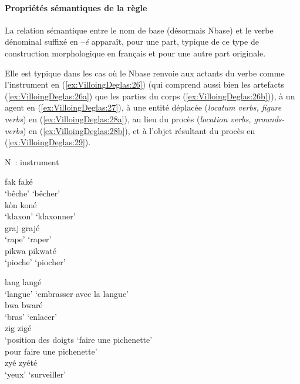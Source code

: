 \documentclass[output=paper]{langsci/langscibook}
\begin{document}
\paragraph{Propriétés sémantiques de la
règle}\label{propriétés-sémantiques-de-la-ruxe8gle}

La relation sémantique entre le nom de base (désormais Nbase) et le
verbe dénominal suffixé en --\emph{é} apparaît, pour une part, typique
de ce type de construction morphologique en français et pour une autre
part originale.

Elle est typique dans les cas où le Nbase renvoie aux actants du verbe
comme l'instrument en (\ref{ex:VilloingDeglas:26}) (qui comprend aussi bien les artefacts (\ref{ex:VilloingDeglas:26a})
que les parties du corps (\ref{ex:VilloingDeglas:26b})), à un agent en (\ref{ex:VilloingDeglas:27}), à une entité
déplacée (\emph{locatum verbs, figure verbs}) en (\ref{ex:VilloingDeglas:28a}), au lieu du
procès (\emph{location verbs, grounds-verbs}) en (\ref{ex:VilloingDeglas:28b}), et à l'objet
résultant du procès en (\ref{ex:VilloingDeglas:29}).

\ea \label{ex:VilloingDeglas:26} N~: instrument

  \ea\label{ex:VilloingDeglas:26a}
  \ea \gll fak \textrightarrow{} faké\\
  {`bêche'} {} {`bêcher'}\\
  \ex \gll kòn \textrightarrow{} koné\\
  {`klaxon'} {} {`klaxonner'}\\
  \ex \gll graj \textrightarrow{} grajé\\
  {`rape'} {} {`raper'}\\
  \ex \gll pikwa \textrightarrow{} pikwaté\\
  {`pioche'} {} {`piocher'}\\
  \z

  \ex\label{ex:VilloingDeglas:26b}
  \ea \gll lang \textrightarrow{} langé\\
  {`langue'} {} {`embrasser avec la langue'}\\
  \ex \gll bwa \textrightarrow{} bwaré\\
  {`bras'} {} {`enlacer'}\\
  \ex \glll zig \textrightarrow{} zigé\\
  {`position des doigts} {} {`faire une
  pichenette'}\\
  {pour faire une pichenette'} {} {}\\
  \ex \gll zyé \textrightarrow{} zyété\\
  {`yeux'} {} {`surveiller'}\\
  \z\z
\end{document}
